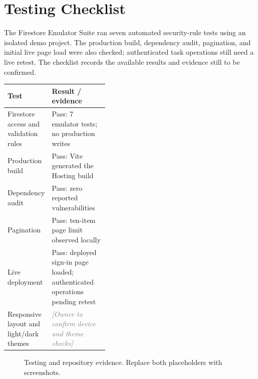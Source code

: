 \documentclass[11pt,a4paper]{article}
\newcommand{\placeholder}[1]{\textcolor{gray}{\textit{[#1]}}}
\begin{document}
\section{Testing Checklist}

The Firestore Emulator Suite ran seven automated security-rule tests using an isolated demo project. The production build, dependency audit, pagination, and initial live page load were also checked; authenticated task operations still need a live retest. The checklist records the available results and evidence still to be confirmed.

\begin{center}
\small
\begin{tabularx}{\linewidth}{>{\raggedright\arraybackslash}p{0.40\linewidth} X}
\hline
\textbf{Test} & \textbf{Result / evidence} \\
\hline
Firestore access and validation rules & Pass: 7 emulator tests; no production writes \\
Production build & Pass: Vite generated the Hosting build \\
Dependency audit & Pass: zero reported vulnerabilities \\
Pagination & Pass: ten-item page limit observed locally \\
Live deployment & Pass: deployed sign-in page loaded; authenticated operations pending retest \\
Responsive layout and light/dark themes & \placeholder{Owner to confirm device and theme checks} \\
\hline
\end{tabularx}
\end{center}

\begin{figure}[htbp]
  \centering
  \hfill
  \caption{Testing and repository evidence. Replace both placeholders with screenshots.}
  \label{fig:testing-evidence}
\end{figure}
\end{document}
